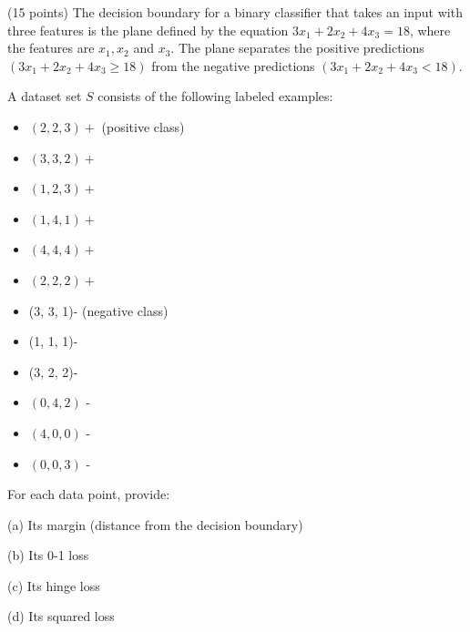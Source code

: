 \documentclass[en,hazy,blue,12pt,normal]{elegantnote}
\begin{document}
\begin{homework}
    (15 points) The decision boundary for a binary classifier that takes an input with three features is the plane defined by the equation $3 x_1+2 x_2+4 x_3=18$, where the features are $x_1, x_2$ and $x_3$. The plane separates the positive predictions $\left(3 x_1+2 x_2+4 x_3 \geq 18\right)$ from the negative predictions $\left(3 x_1+2 x_2+4 x_3<18\right)$.

A dataset set $S$ consists of the following labeled examples:

\begin{itemize}
    \item $(2,2,3)+$ (positive class)
    \item $(3,3,2)+$
    \item $(1,2,3)+$
    \item $(1,4,1)+$
    \item $(4,4,4)+$
    \item $(2,2,2)+$
    \item (3, 3, 1)- (negative class)
    \item (1, 1, 1)-
    \item (3, 2, 2)-
    \item $(0,4,2)$ -
    \item $(4,0,0)$ -
    \item $(0,0,3)$ -
\end{itemize}
For each data point, provide:

(a) Its margin (distance from the decision boundary)

(b) Its 0-1 loss

(c) Its hinge loss

(d) Its squared loss
\end{homework}
\end{document}
